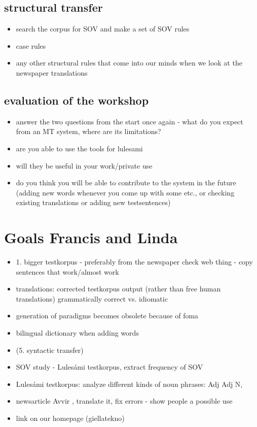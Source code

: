 \documentclass[a4paper,english,12pt]{article}
\begin{document}
\begin{spacing}{1.0}
\subsection{structural transfer} 

\begin{itemize}
\item search the corpus for SOV and make a set of SOV rules
\item case rules
\item any other structural rules that come into our minds when we look at the newspaper translations
\end{itemize}

\subsection{evaluation of the workshop} 
\begin{itemize}
\item answer the two questions from the start once again - what do you expect from an MT system, where are its limitations?
\item are you able to use the tools for lulesami
\item will they be useful in your work/private use
\item do you think you will be able to contribute to the system in the future (adding new words whenever you come up with some etc., or checking existing translations or adding new testsentences)
\end{itemize}
 

\section{Goals Francis and Linda}

\begin{itemize}
\item 1. bigger testkorpus - preferably from the newspaper
check web thing - copy sentences that work/almost work
\item translations: corrected testkorpus output (rather than free human translations) grammatically correct vs. idiomatic 
\item generation of paradigms becomes obsolete because of foma
\item bilingual dictionary when adding words
\item (5. syntactic transfer)
\item SOV study - Lulesámi testkorpus, extract frequency of SOV
\item Lulesámi testkorpus: analyze different kinds of noun phrases: Adj Adj N, 
\item newsarticle Avvir , translate it, fix errors - show people a possible use
\item link on our homepage (giellatekno)
\end{itemize}   
    

\end{spacing}
\end{document}
